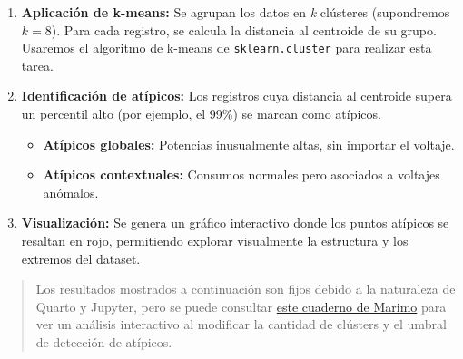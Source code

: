 \documentclass[
  spanish,
  letterpaper,
  DIV=11,
  numbers=noendperiod]{scrreprt}
\providecommand{\tightlist}{%
  \setlength{\itemsep}{0pt}\setlength{\parskip}{0pt}}
\begin{document}
\begin{enumerate}
\def\labelenumi{\arabic{enumi}.}
\setcounter{enumi}{2}
\item
  \textbf{Aplicación de k-means:} Se agrupan los datos en \emph{k}
  clústeres (supondremos \(k=8\)). Para cada registro, se calcula la
  distancia al centroide de su grupo. Usaremos el algoritmo de k-means
  de \texttt{sklearn.cluster} para realizar esta tarea.
\item
  \textbf{Identificación de atípicos:} Los registros cuya distancia al
  centroide supera un percentil alto (por ejemplo, el 99\%) se marcan
  como atípicos.

  \begin{itemize}
  \tightlist
  \item
    \textbf{Atípicos globales:} Potencias inusualmente altas, sin
    importar el voltaje.
  \item
    \textbf{Atípicos contextuales:} Consumos normales pero asociados a
    voltajes anómalos.
  \end{itemize}
\item
  \textbf{Visualización:} Se genera un gráfico interactivo donde los
  puntos atípicos se resaltan en rojo, permitiendo explorar visualmente
  la estructura y los extremos del dataset.
\end{enumerate}

\begin{quote}
Los resultados mostrados a continuación son fijos debido a la naturaleza
de Quarto y Jupyter, pero se puede consultar
\href{https://molab.marimo.io/notebooks/nb_SjX8JxW8MgH6GjkQaARuKq}{este
cuaderno de Marimo} para ver un análisis interactivo al modificar la
cantidad de clústers y el umbral de detección de atípicos.
\end{quote}
\end{document}
